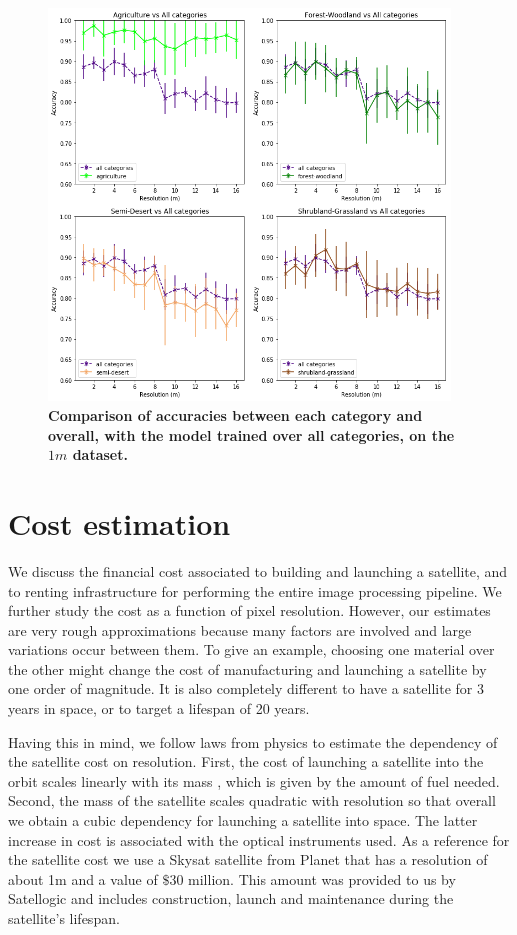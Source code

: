 \begin{figure}[H]
	\centering
	\includegraphics[width=0.95\textwidth]{Figures/results/acc_res_by_category_1m.png}
	\captionsetup{width=1\linewidth}
	\caption{\textbf{Comparison of accuracies between each category and overall, with the model trained over all categories, on the $1m$ dataset.}}
	\label{fig:acc_by_cat_1m}
\end{figure}

\section{Cost estimation}

We discuss the financial cost associated to building and launching a satellite, and to renting infrastructure for performing the entire image processing pipeline. We further study the cost as a function of pixel resolution. However, our estimates are very rough approximations because many factors are involved and large variations occur between them. To give an example, choosing one material over the other might change the cost of manufacturing and launching a satellite by one order of magnitude. It is also completely different to have a satellite for 3 years in space, or to target a lifespan of 20 years. 

Having this in mind, we follow laws from physics to estimate the dependency of the satellite cost on resolution. First, the cost of launching a satellite into the orbit scales linearly with its mass \parencite{rocket_equation}, which is given by the amount of fuel needed. Second, the mass of the satellite scales quadratic with resolution so that overall we obtain a cubic dependency for launching a satellite into space. The latter increase in cost is associated with the optical instruments used. As a reference for the satellite cost we use a Skysat satellite from Planet \parencite{skysat_planet} that has a resolution of about 1m and a value of $\$30$ million. This amount was provided to us by Satellogic and includes construction, launch and maintenance during the satellite's lifespan.

